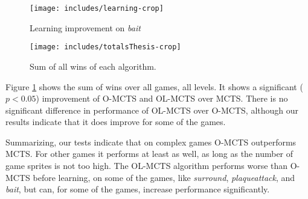 \begin{figure}
	\hfill
	\begin{minipage}{.45\textwidth}
		\begin{center}
			\texttt{[image: includes/learning-crop]}
			\caption{Learning improvement on \textit{bait}}
			\label{fig:learning-results}
		\end{center}
	\end{minipage}
	\hfill
	\begin{minipage}{.45\textwidth}
		\texttt{[image: includes/totalsThesis-crop]}
		\caption{Sum of all wins of each algorithm.}
		\label{fig:total-results}
	\end{minipage}
	\hfill
\end{figure}

Figure \ref{fig:total-results} shows the sum of wins over all games, all levels.
It shows a significant ($p < 0.05$) improvement of O-MCTS and OL-MCTS over MCTS.
There is no significant difference in performance of OL-MCTS over O-MCTS,
although our results indicate that it does improve for some of the games.

Summarizing, our tests indicate that on complex games O-MCTS outperforms MCTS.
For other games it performs at least as well, as long as the number of game
sprites is not too high. 
The OL-MCTS algorithm performs worse than O-MCTS before learning, on some of the
games, like \textit{surround}, \textit{plaqueattack}, and \textit{bait}, but
can, for some of the games, increase performance significantly.
